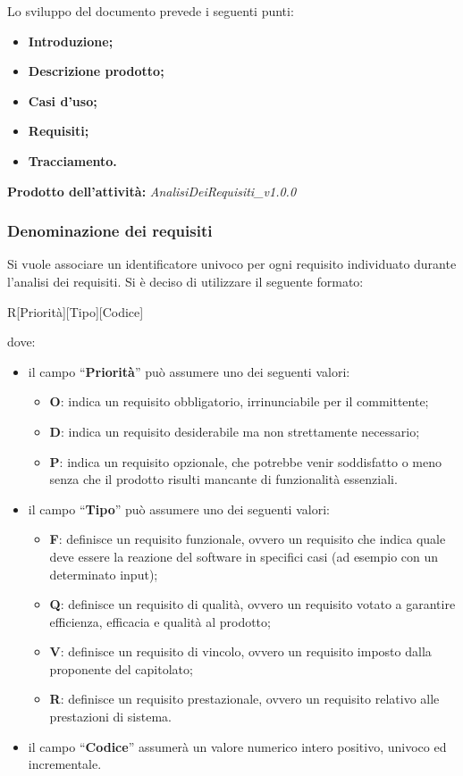 \documentclass[11pt,a4paper]{article}
\begin{document}
	Lo sviluppo del documento prevede i seguenti punti:	
	\begin{itemize}
		\item \textbf{Introduzione;}
		\item \textbf{Descrizione prodotto;}
		\item \textbf{Casi d'uso;}
		\item \textbf{Requisiti;}
		\item \textbf{Tracciamento.}
	\end{itemize}

	\textbf{Prodotto dell'attività:} \textit{AnalisiDeiRequisiti\_v1.0.0}
	
	\subsubsection{Denominazione dei requisiti}
	Si vuole associare un identificatore univoco per ogni requisito individuato durante l'analisi dei requisiti. Si \`e deciso di utilizzare il seguente formato:
	\begin{center}
		R[Priorità][Tipo][Codice]
\end{center}
dove:
\begin{itemize}
\item il campo “\textbf{Priorità}” può assumere uno dei seguenti valori:
\begin{itemize}
	\item \textbf{O}: indica un requisito obbligatorio, irrinunciabile per il committente;
	\item \textbf{D}: indica un requisito desiderabile ma non strettamente necessario;
	\item \textbf{P}: indica un requisito opzionale, che potrebbe venir soddisfatto o meno senza che il prodotto risulti mancante di funzionalità essenziali.
\end{itemize}
\item il campo “\textbf{Tipo}” può assumere uno dei seguenti valori:
\begin{itemize}
	\item \textbf{F}: definisce un requisito funzionale, ovvero un requisito che indica quale deve essere la reazione del software in specifici casi (ad esempio con  un determinato input);
	\item \textbf{Q}: definisce un requisito di qualità, ovvero un requisito votato a garantire efficienza, efficacia e qualità al prodotto;
	\item \textbf{V}: definisce un requisito di vincolo, ovvero un requisito imposto dalla proponente del capitolato;
	\item \textbf{R}: definisce un requisito prestazionale, ovvero un requisito relativo alle prestazioni di sistema.
\end{itemize}
\item il campo “\textbf{Codice}” assumerà un valore numerico intero positivo, univoco ed incrementale.
\end{itemize}
\end{document}
